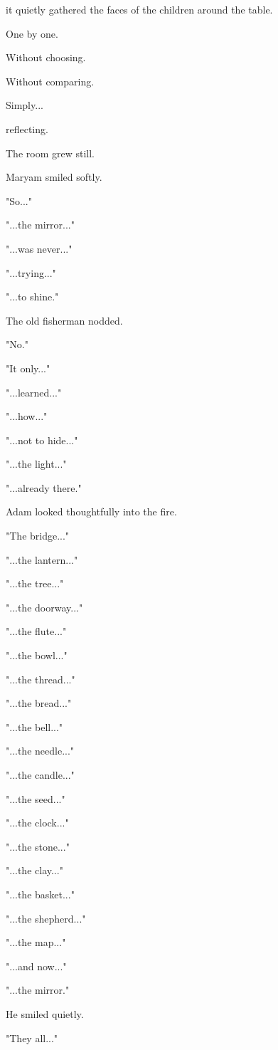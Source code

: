 \documentclass[12pt,openany]{book}
\begin{document}
it quietly gathered the faces of the children around the table.

One by one.

Without choosing.

Without comparing.

Simply...

reflecting.

The room grew still.

Maryam smiled softly.

"So..."

"...the mirror..."

"...was never..."

"...trying..."

"...to shine."

The old fisherman nodded.

"No."

"It only..."

"...learned..."

"...how..."

"...not to hide..."

"...the light..."

"...already there."

Adam looked thoughtfully into the fire.

"The bridge..."

"...the lantern..."

"...the tree..."

"...the doorway..."

"...the flute..."

"...the bowl..."

"...the thread..."

"...the bread..."

"...the bell..."

"...the needle..."

"...the candle..."

"...the seed..."

"...the clock..."

"...the stone..."

"...the clay..."

"...the basket..."

"...the shepherd..."

"...the map..."

"...and now..."

"...the mirror."

He smiled quietly.

"They all..."
\end{document}
